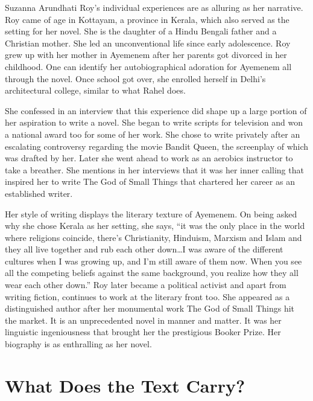 Suzanna Arundhati Roy’s individual experiences are as alluring as her narrative. Roy came of age in Kottayam, a province in Kerala, which also served as the setting for her novel. She is the daughter of a Hindu Bengali father and a Christian mother. She led an unconventional life since early adolescence. Roy grew up with her mother in Ayemenem after her parents got divorced in her childhood. One can identify her autobiographical adoration for Ayemenem all through the novel. Once school got over, she enrolled herself in Delhi’s architectural college, similar to what Rahel does.

She confessed in an interview that this experience did shape up a large portion of her aspiration to write a novel. She began to write scripts for television and won a national award too for some of her work. She chose to write privately after an escalating controversy regarding the movie Bandit Queen, the screenplay of which was drafted by her. Later she went ahead to work as an aerobics instructor to take a breather. She mentions in her interviews that it was her inner calling that inspired her to write The God of Small Things that chartered her career as an established writer.

Her style of writing displays the literary texture of Ayemenem. On being asked why she chose Kerala as her setting, she says, ``it was the only place in the world where religions coincide, there's Christianity, Hinduism, Marxism and Islam and they all live together and rub each other down\ldots I was aware of the different cultures when I was growing up, and I'm still aware of them now. When you see all the competing beliefs against the same background, you realize how they all wear each other down.'' \parencite[p.~36]{TalwarShashi}  Roy later became a political activist and apart from writing fiction, continues to work at the literary front too. She appeared as a distinguished author after her monumental work The God of Small Things hit the market. It is an unprecedented novel in manner and matter. It was her linguistic ingeniousness that brought her the prestigious Booker Prize. Her biography is as enthralling as her novel.

\section{What Does the Text Carry?}

